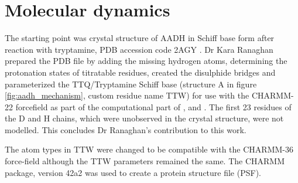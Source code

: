 \section{Molecular dynamics}\label{sec:aadh_md}

The starting point was crystal structure of AADH in Schiff base form after reaction with tryptamine, PDB accession code 2AGY \cite{masgrauAtomicDescriptionEnzyme2006}. Dr Kara Ranaghan prepared the PDB file by adding the missing hydrogen atoms, determining the protonation states of titratable residues, created the disulphide bridges and parameterized the TTQ/Tryptamine Schiff base (structure A in figure \ref{fig:aadh_mechanism}, custom residue name TTW) for use with the CHARMM-22 forcefield \cite{a.d.mackerellAllAtomEmpiricalPotential1998} as part of the computational part of \cite{masgrauAtomicDescriptionEnzyme2006}, \cite{masgrauTunnelingClassicalPaths2007} and \cite{ranaghanInitioQMMM2017}.  The first 23 residues of the D and H chains, which were unobserved in the crystal structure, were not modelled. This concludes Dr Ranaghan's contribution to this work. 

The atom types in TTW were changed to be compatible with the CHARMM-36 \cite{huangCHARMM36AllatomAdditive2013} force-field although the TTW parameters remained the same. The CHARMM package, version 42a2 \cite{brooksCHARMMBiomolecularSimulation2009} was used to create a protein structure file (PSF). 

